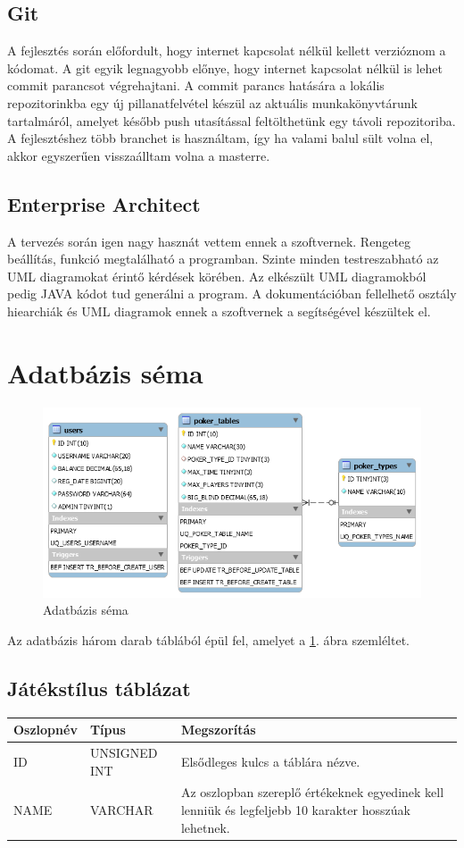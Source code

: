 \subsection{Git}
A fejlesztés során előfordult, hogy internet kapcsolat nélkül kellett verzióznom a kódomat. A git egyik legnagyobb előnye, hogy internet kapcsolat nélkül is lehet commit parancsot végrehajtani. A commit parancs hatására a lokális repozitorinkba egy új pillanatfelvétel készül az aktuális munkakönyvtárunk tartalmáról, amelyet később push utasítással feltölthetünk egy távoli repozitoriba. A fejlesztéshez több branchet is használtam, így ha valami balul sült volna el, akkor egyszerűen visszaálltam volna a masterre.

\subsection{Enterprise Architect}
A tervezés során igen nagy hasznát vettem ennek a szoftvernek. Rengeteg beállítás, funkció megtalálható a programban. Szinte minden testreszabható az UML diagramokat érintő kérdések körében. Az elkészült UML diagramokból pedig JAVA kódot tud generálni a program. A dokumentációban fellelhető osztály hiearchiák és UML diagramok ennek a szoftvernek a segítségével készültek el.

\section{Adatbázis séma} \label{sec:db-schema}
\begin{figure}[h!]
  \caption{Adatbázis séma}
  \label{fig:db_scheme}
  \centering
    \includegraphics[width=\textwidth]{user-documentation/images/db_scheme2.png}
\end{figure}
Az adatbázis három darab táblából épül fel, amelyet a \ref{fig:db_scheme}. ábra szemléltet.

\subsection{Játékstílus táblázat}
\begin{tabular}{| C{3.8cm} | C{4.2cm} | C{6.1cm} |}
\hline
 \textbf{Oszlopnév} & \textbf{Típus} & \textbf{Megszorítás} \\ \hline
  ID & UNSIGNED INT & Elsődleges kulcs a táblára nézve. \\ \hline
  NAME & VARCHAR & Az oszlopban szereplő értékeknek egyedinek kell lenniük és legfeljebb 10 karakter hosszúak lehetnek.  \\ \hline
\end{tabular}


